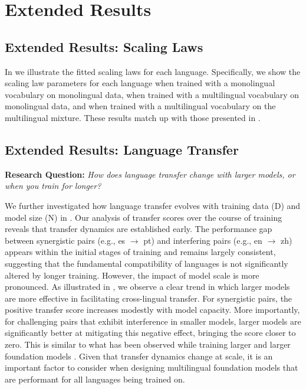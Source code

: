 \section{Extended Results}

\subsection{Extended Results: Scaling Laws}
\label{app:scaling-laws}



In  we illustrate the fitted scaling laws for each language.
Specifically, we show the scaling law parameters for each language when trained with a monolingual vocabulary on monolingual data, when trained with a multilingual vocabulary on monolingual data, and when trained with a multilingual vocabulary on the \unimax{} multilingual mixture.
These results match up with those presented in .

\subsection{Extended Results: Language Transfer}
\label{app:lang-transfer}

\textbf{Research Question:} \emph{How does language transfer change with larger models, or when you train for longer?}

We further investigated how language transfer evolves with training data (D) and model size (N) in . Our analysis of transfer scores over the course of training reveals that transfer dynamics are established early. The performance gap between synergistic pairs (e.g., es $\rightarrow$ pt) and interfering pairs (e.g., en $\rightarrow$ zh) appears within the initial stages of training and remains largely consistent, suggesting that the fundamental compatibility of languages is not significantly altered by longer training. However, the impact of model scale is more pronounced. As illustrated in , we observe a clear trend in which larger models are more effective in facilitating cross-lingual transfer. For synergistic pairs, the positive transfer score increases modestly with model capacity. More importantly, for challenging pairs that exhibit interference in smaller models, larger models are significantly better at mitigating this negative effect, bringing the score closer to zero.  This is similar to what has been observed while training larger and larger foundation models \citep{team2024gemini}. Given that transfer dynamics change at scale, it is an important factor to consider when designing multilingual foundation models that are performant for all languages being trained on. 

